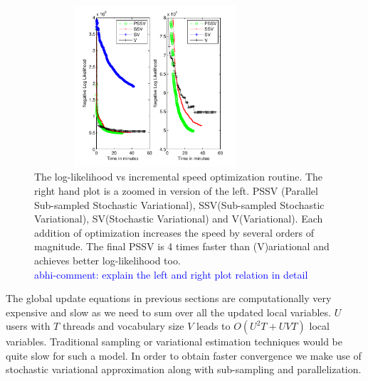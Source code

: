 \documentclass{sig-alternate}
\newcommand{\abhi}[1]{\textcolor{blue}{\\ abhi-comment: #1}}
\begin{document}
\begin{figure}
\begin{center}
\includegraphics[height=6cm,width=9cm]{SpeedOptimization.pdf}
\end{center}
\caption{\small{The log-likelihood vs incremental speed optimization routine. 
The right hand plot is a zoomed in version of the left. PSSV
(Parallel Sub-sampled Stochastic Variational), SSV(Sub-sampled Stochastic
Variational), SV(Stochastic Variational) and V(Variational). Each addition of
optimization increases the speed by several orders of magnitude. The final PSSV
is 4 times faster than (V)ariational and achieves better log-likelihood too.
\abhi{explain the left and right plot relation in detail}}}
\label{fig:SpeedOptimization}
\end{figure}
The global update equations in previous sections are computationally
very expensive and slow as we need to sum over all the updated local
variables. $U$ users with $T$ threads and vocabulary size $V$ leads to
$O(U^2T+UVT)$ local variables. Traditional sampling or 
variational estimation techniques would be
quite slow for such a model. In order to obtain faster convergence we
make use of stochastic variational approximation along with
sub-sampling and parallelization. 
\end{document}
